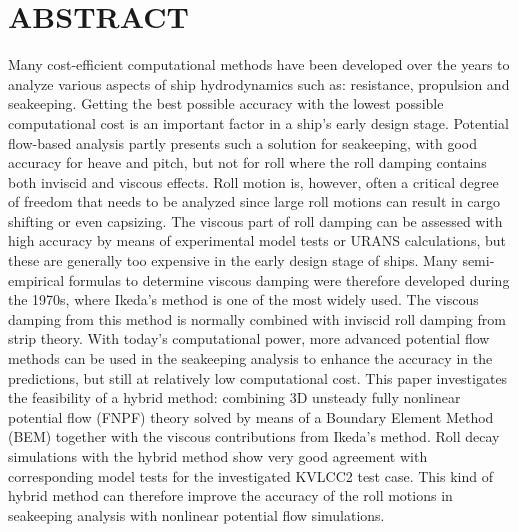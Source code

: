 \section*{ABSTRACT}\label{abstract}
Many cost-efficient computational methods have been developed over the
years to analyze various aspects of ship hydrodynamics such as:
resistance, propulsion and seakeeping. Getting the best possible
accuracy with the lowest possible computational cost is an important
factor in a ship's early design stage. Potential flow-based analysis
partly presents such a solution for seakeeping, with good accuracy for
heave and pitch, but not for roll where the roll damping contains both
inviscid and viscous effects. Roll motion is, however, often a critical
degree of freedom that needs to be analyzed since large roll motions can
result in cargo shifting or even capsizing. The viscous part of roll
damping can be assessed with high accuracy by means of experimental
model tests or URANS calculations, but these are generally too expensive
in the early design stage of ships. Many semi-empirical formulas to
determine viscous damping were therefore developed during the 1970s,
where Ikeda's method is one of the most widely used. The viscous damping
from this method is normally combined with inviscid roll damping from
strip theory. With today's computational power, more advanced potential
flow methods can be used in the seakeeping analysis to enhance the
accuracy in the predictions, but still at relatively low computational
cost. This paper investigates the feasibility of a hybrid method:
combining 3D unsteady fully nonlinear potential flow (FNPF) theory
solved by means of a Boundary Element Method (BEM) together with the
viscous contributions from Ikeda's method. Roll decay simulations with
the hybrid method show very good agreement with corresponding model
tests for the investigated KVLCC2 test case. This kind of hybrid method
can therefore improve the accuracy of the roll motions in seakeeping
analysis with nonlinear potential flow simulations.
